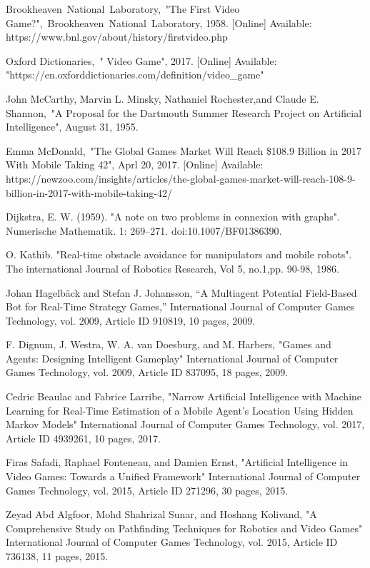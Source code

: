 \begin{thebibliography}{1}
	

	Brookheaven~National~Laboratory,~"The First Video Game?",~Brookheaven~National~Laboratory, 1958. [Online] Available: https://www.bnl.gov/about/history/firstvideo.php

	Oxford Dictionaries,~" Video Game", 2017. [Online] Available: "https://en.oxforddictionaries.com/definition/video\_game"


	John McCarthy, Marvin L. Minsky, Nathaniel Rochester,and Claude E. Shannon,~"A Proposal for the Dartmouth Summer Research Project on Artificial Intelligence", August 31, 1955.

	Emma McDonald,~"The Global Games Market Will Reach \$108.9 Billion in 2017 With Mobile Taking 42", Aprl 20, 2017. [Online] Available: https://newzoo.com/insights/articles/the-global-games-market-will-reach-108-9-billion-in-2017-with-mobile-taking-42/

	Dijkstra, E. W. (1959). "A note on two problems in connexion with graphs". Numerische Mathematik. 1: 269–271. doi:10.1007/BF01386390.

 O. Kathib. "Real-time obstacle avoidance for manipulators and mobile robots". The international Journal of Robotics Research, Vol 5, no.1,pp. 90-98, 1986.


 Johan Hagelbäck and Stefan J. Johansson, “A Multiagent Potential Field-Based Bot for Real-Time Strategy Games,” International Journal of Computer Games Technology, vol. 2009, Article ID 910819, 10 pages, 2009. 
  
F. Dignum, J. Westra, W. A. van Doesburg, and M. Harbers, "Games and Agents: Designing Intelligent Gameplay" International Journal of Computer Games Technology, vol. 2009, Article ID 837095, 18 pages, 2009.


Cedric Beaulac and Fabrice Larribe, "Narrow Artificial Intelligence with Machine Learning for Real-Time Estimation of a Mobile Agent’s Location Using Hidden Markov Models" International Journal of Computer Games Technology, vol. 2017, Article ID 4939261, 10 pages, 2017. 


Firas Safadi, Raphael Fonteneau, and Damien Ernst, "Artificial Intelligence in Video Games: Towards a Unified Framework" International Journal of Computer Games Technology, vol. 2015, Article ID 271296, 30 pages, 2015.


Zeyad Abd Algfoor, Mohd Shahrizal Sunar, and Hoshang Kolivand, "A Comprehensive Study on Pathfinding Techniques for Robotics and Video Games" International Journal of Computer Games Technology, vol. 2015, Article ID 736138, 11 pages, 2015.


\end{thebibliography}